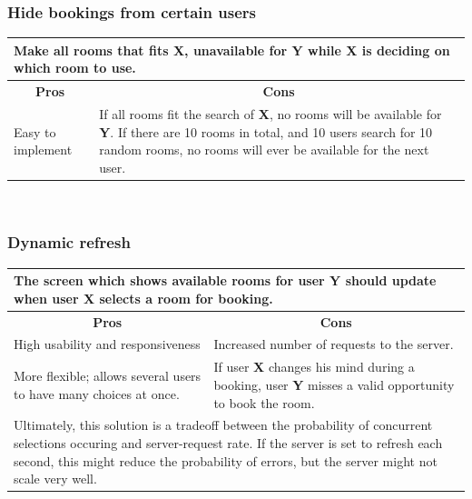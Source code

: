 \subsubsection*{Hide bookings from certain users}
\begin{tabular}{|p{6cm}|p{6cm}|}
\hline 
	\multicolumn{2}{|p{12cm}|}{Make all rooms that fits \textbf{X}, unavailable for \textbf{Y} while \textbf{X} is deciding on which room to use.} \\ \hline \hline
	\multicolumn{1}{|c|}{\textbf{Pros}} & \multicolumn{1}{c|}{\textbf{Cons}} \\ \hline
	Easy to implement & If all rooms fit the search of \textbf{X}, no rooms will be available for \textbf{Y}. If there are 10 rooms in total, and 10 users search for 10 random rooms, no rooms will ever be available for the next user. \\
	\hline
\end{tabular}
\\
\subsubsection*{Dynamic refresh}
\begin{tabular}{|p{6cm}|p{6cm}|}
\hline
	\multicolumn{2}{|p{12cm}|}{The screen which shows available rooms for user \textbf{Y} should update when user \textbf{X} selects a room for booking.} \\ \hline \hline
	\multicolumn{1}{|c|}{\textbf{Pros}} & \multicolumn{1}{c|}{\textbf{Cons}} \\ \hline
	High usability and responsiveness & Increased number of requests to the server. \\ \hline
	More flexible; allows several users to have many choices at once. & If user \textbf{X} changes his mind during a booking, user \textbf{Y} misses a valid opportunity to book the room.\\
	\hline
	\multicolumn{2}{|p{12cm}|}{Ultimately, this solution is a tradeoff between the probability of concurrent selections occuring and server-request rate. If the server is set to refresh each second, this might reduce the probability of errors, but the server might not scale very well.} \\
	\hline
\end{tabular}
